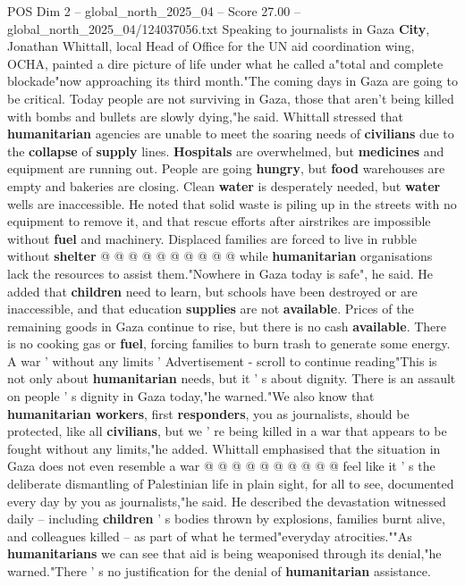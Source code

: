 \begin{textsample}{POS Dim 2 – global\_north\_2025\_04 – Score 27.00 – global\_north\_2025\_04/124037056.txt}  \label{ex:f2_pos_328}
Speaking to journalists in Gaza \textbf{City}, Jonathan Whittall, local Head of Office for the UN aid coordination wing, OCHA, painted a dire picture of life under what he called a"total and complete blockade"now approaching its third month."The coming days in Gaza are going to be critical.
Today people are not surviving in Gaza, those that aren't being killed with bombs and bullets are slowly dying,"he said.
Whittall stressed that \textbf{humanitarian} agencies are unable to meet the soaring needs of \textbf{civilians} due to the \textbf{collapse} of \textbf{supply} lines. \textbf{Hospitals} are overwhelmed, but \textbf{medicines} and equipment are running out.
People are going \textbf{hungry}, but \textbf{food} warehouses are empty and bakeries are closing.
Clean \textbf{water} is desperately needed, but \textbf{water} wells are inaccessible.
He noted that solid waste is piling up in the streets with no equipment to remove it, and that rescue efforts after airstrikes are impossible without \textbf{fuel} and machinery.
Displaced families are forced to live in rubble without \textbf{shelter} @ @ @ @ @ @ @ @ @ @ while \textbf{humanitarian} organisations lack the resources to assist them."Nowhere in Gaza today is safe", he said.
He added that \textbf{children} need to learn, but schools have been destroyed or are inaccessible, and that education \textbf{supplies} are not \textbf{available}.
Prices of the remaining goods in Gaza continue to rise, but there is no cash \textbf{available}.
There is no cooking gas or \textbf{fuel}, forcing families to burn trash to generate some energy.
A war ' without any limits ' Advertisement - scroll to continue reading"This is not only about \textbf{humanitarian} needs, but it ' s about dignity.
There is an assault on people ' s dignity in Gaza today,"he warned."We also know that \textbf{humanitarian} \textbf{workers}, first \textbf{responders}, you as journalists, should be protected, like all \textbf{civilians}, but we ' re being killed in a war that appears to be fought without any limits,"he added.
Whittall emphasised that the situation in Gaza does not even resemble a war @ @ @ @ @ @ @ @ @ @ feel like it ' s the deliberate dismantling of Palestinian life in plain sight, for all to see, documented every day by you as journalists,"he said.
He described the devastation witnessed daily -- including \textbf{children} ' s bodies thrown by explosions, families burnt alive, and colleagues killed -- as part of what he termed"everyday atrocities.""As \textbf{humanitarians} we can see that aid is being weaponised through its denial,"he warned."There ' s no justification for the denial of \textbf{humanitarian} assistance.

\end{textsample}
